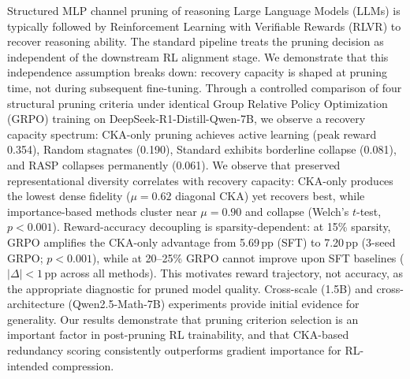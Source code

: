 Structured MLP channel pruning of reasoning Large Language Models (LLMs) is typically followed by Reinforcement Learning with Verifiable Rewards (RLVR) to recover reasoning ability.
The standard pipeline treats the pruning decision as independent of the downstream RL alignment stage.
We demonstrate that this independence assumption breaks down: recovery capacity is shaped at pruning time, not during subsequent fine-tuning.
Through a controlled comparison of four structural pruning criteria under identical Group Relative Policy Optimization (GRPO) training on DeepSeek-R1-Distill-Qwen-7B, we observe a recovery capacity spectrum: CKA-only pruning achieves active learning (peak reward 0.354), Random stagnates (0.190), Standard exhibits borderline collapse (0.081), and RASP collapses permanently (0.061).
We observe that preserved representational diversity correlates with recovery capacity: CKA-only produces the lowest dense fidelity ($\mu{=}0.62$ diagonal CKA) yet recovers best, while importance-based methods cluster near $\mu{=}0.90$ and collapse (Welch's $t$-test, $p{<}0.001$).
Reward-accuracy decoupling is sparsity-dependent: at 15\% sparsity, GRPO amplifies the CKA-only advantage from 5.69\,pp (SFT) to 7.20\,pp (3-seed GRPO; $p{<}0.001$), while at 20--25\% GRPO cannot improve upon SFT baselines ($|\Delta| < 1$\,pp across all methods).
This motivates reward trajectory, not accuracy, as the appropriate diagnostic for pruned model quality.
Cross-scale (1.5B) and cross-architecture (Qwen2.5-Math-7B) experiments provide initial evidence for generality.
Our results demonstrate that pruning criterion selection is an important factor in post-pruning RL trainability, and that CKA-based redundancy scoring consistently outperforms gradient importance for RL-intended compression.
